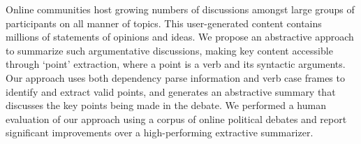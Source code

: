 Online communities host growing numbers of discussions amongst large groups of participants on all manner of topics. This user-generated content contains millions of statements of opinions and ideas. We propose an abstractive approach to summarize such argumentative discussions, making key content accessible through `point' extraction, where a point is a verb and its syntactic arguments. Our approach uses both dependency parse information and verb case frames to identify and extract valid points, and generates an abstractive summary that discusses the key points being made in the debate. We performed a human evaluation of our approach using a corpus of online political debates and report significant improvements over a high-performing extractive summarizer.

